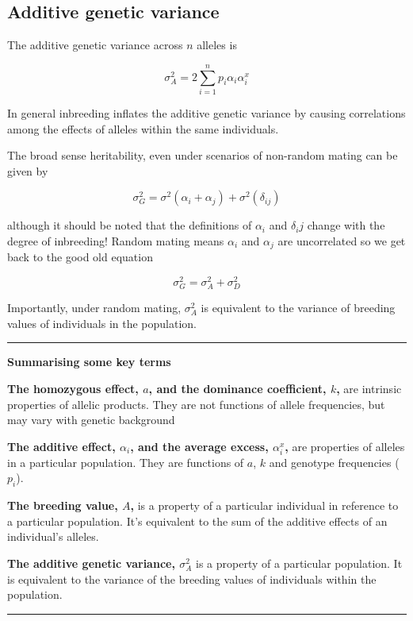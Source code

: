 \documentclass[
]{book}
\begin{document}
\hypertarget{additive-genetic-variance}{%
\subsection{Additive genetic variance}\label{additive-genetic-variance}}

The additive genetic variance across \(n\) alleles is

\[ \sigma^2_A = 2 \sum_{i=1}^{n} p_i\alpha_i\alpha^x_i \]

In general inbreeding inflates the additive genetic variance by causing correlations among the effects of alleles within the same individuals.

The broad sense heritability, even under scenarios of non-random mating can be given by

\[ \sigma^2_G = \sigma^{2}(\alpha_i + \alpha_j) + \sigma^{2}(\delta_{ij}) \]

although it should be noted that the definitions of \(\alpha_i\) and \(\delta_ij\) change with the degree of inbreeding! Random mating means \(\alpha_i\) and \(\alpha_j\) are uncorrelated so we get back to the good old equation

\[ \sigma^2_G = \sigma^2_A + \sigma^2_D \]

Importantly, under random mating, \(\sigma^2_A\) is equivalent to the variance of breeding values of individuals in the population.

\begin{center}\rule{0.5\linewidth}{0.5pt}\end{center}

\textbf{Summarising some key terms}

\textbf{The homozygous effect, \(a\), and the dominance coefficient, \(k\),} are intrinsic properties of allelic products. They are not functions of allele frequencies, but may vary with genetic background

\textbf{The additive effect, \(\alpha_i\), and the average excess, \(\alpha^x_i\),} are properties of alleles in a particular population. They are functions of \(a\), \(k\) and genotype frequencies (\(p_i\)).

\textbf{The breeding value, \(A\),} is a property of a particular individual in reference to a particular population. It's equivalent to the sum of the additive effects of an individual's alleles.

\textbf{The additive genetic variance, \(\sigma^2_A\)} is a property of a particular population. It is equivalent to the variance of the breeding values of individuals within the population.

\begin{center}\rule{0.5\linewidth}{0.5pt}\end{center}

  
\end{document}
